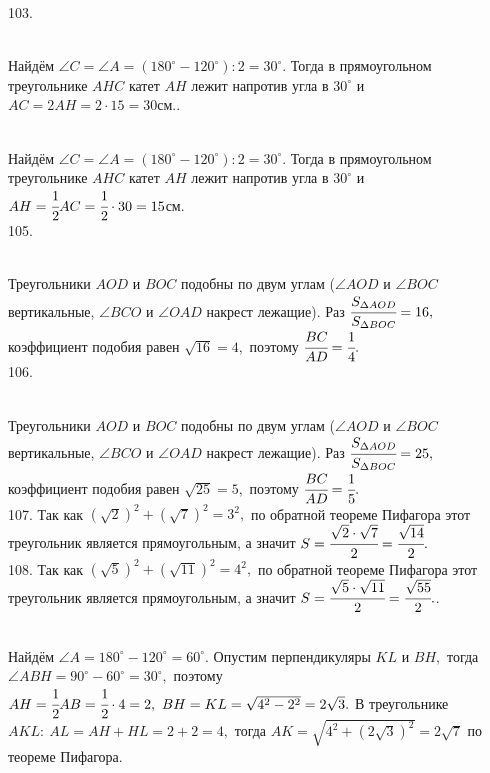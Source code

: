 103. \begin{figure}[ht!]
\end{figure}\\
Найдём $\angle C=\angle A=(180^\circ-120^\circ):2=30^\circ.$ Тогда в прямоугольном треугольнике $AHC$ катет $AH$ лежит напротив угла в $30^\circ$ и $AC=2AH=2\cdot15=30$см.\newpage{}. \begin{figure}[ht!]
\end{figure}\\
Найдём $\angle C=\angle A=(180^\circ-120^\circ):2=30^\circ.$ Тогда в прямоугольном треугольнике $AHC$ катет $AH$ лежит напротив угла в $30^\circ$ и
$AH=\cfrac{1}{2}AC=\cfrac{1}{2}\cdot30=15$см.\\
105. \begin{figure}[ht!]
\end{figure}\\
Треугольники $AOD$ и $BOC$ подобны по двум углам ($\angle AOD$ и $\angle BOC$ вертикальные, $\angle BCO$ и $\angle OAD$ накрест лежащие). Раз
$\cfrac{S_{\Delta AOD}}{S_{\Delta BOC}}=16,$ коэффициент подобия равен $\sqrt{16}=4,$ поэтому $\cfrac{BC}{AD}=\cfrac{1}{4}.$\\
106. \begin{figure}[ht!]
\end{figure}\\
Треугольники $AOD$ и $BOC$ подобны по двум углам ($\angle AOD$ и $\angle BOC$ вертикальные, $\angle BCO$ и $\angle OAD$ накрест лежащие). Раз
$\cfrac{S_{\Delta AOD}}{S_{\Delta BOC}}=25,$ коэффициент подобия равен $\sqrt{25}=5,$ поэтому $\cfrac{BC}{AD}=\cfrac{1}{5}.$\\
107. Так как $(\sqrt{2})^2+(\sqrt{7})^2=3^2,$ по обратной теореме Пифагора этот треугольник является прямоугольным, а значит $S=\cfrac{\sqrt{2}\cdot\sqrt{7}}{2}=\cfrac{\sqrt{14}}{2}.$\\
108. Так как $(\sqrt{5})^2+(\sqrt{11})^2=4^2,$ по обратной теореме Пифагора этот треугольник является прямоугольным, а значит $S=\cfrac{\sqrt{5}\cdot\sqrt{11}}{2}=\cfrac{\sqrt{55}}{2}.$\newpage{}. \begin{figure}[ht!]
\end{figure}\\
Найдём $\angle A=180^\circ-120^\circ=60^\circ.$ Опустим перпендикуляры $KL$ и $BH,$ тогда $\angle ABH=90^\circ-60^\circ=30^\circ,$ поэтому $AH=\cfrac{1}{2}AB=\cfrac{1}{2}\cdot4=2,\ BH=KL=\sqrt{4^2-2^2}=2\sqrt{3}.$ В треугольнике $AKL:\ AL=AH+HL=2+2=4,$ тогда $AK=\sqrt{4^2+(2\sqrt{3})^2}=2\sqrt{7}$ по теореме Пифагора.\\
